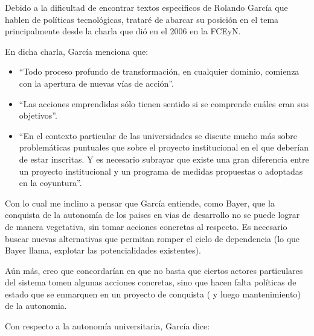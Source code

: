 Debido a la dificultad de encontrar textos especificos de Rolando García que hablen de políticas tecnológicas, trataré de abarcar su posición en el tema principalmente desde la charla que dió en el 2006 en la FCEyN.

En dicha charla, García menciona que:

\begin{itemize}
    \item ``Todo proceso profundo de transformación, en cualquier dominio, comienza con la apertura de nuevas vías de acción''.
    \item ``Las acciones emprendidas sólo tienen sentido si se comprende cuáles eran sus objetivos''.
    \item ``En el contexto particular de las universidades se discute mucho más sobre problemáticas puntuales que sobre el proyecto institucional en el que deberían de estar inscritas. Y es necesario subrayar que existe una gran diferencia entre un proyecto institucional y un programa de medidas propuestas o adoptadas en la coyuntura''.
\end{itemize}

Con lo cual me inclino a pensar que García entiende, como Bayer, que la conquista de la autonomía de los paises en vias de desarrollo no se puede lograr de manera vegetativa, sin tomar acciones concretas al respecto. Es necesario buscar nuevas alternativas que permitan romper el ciclo de dependencia (lo que Bayer llama, explotar las potencialidades existentes).

Aún más, creo que concordarían en que no basta que ciertos actores particulares del sistema tomen algunas acciones concretas, sino que hacen falta políticas de estado que se enmarquen en un proyecto de conquista ( y luego mantenimiento) de la autonomia.

Con respecto a la autonomía universitaria, García dice:

